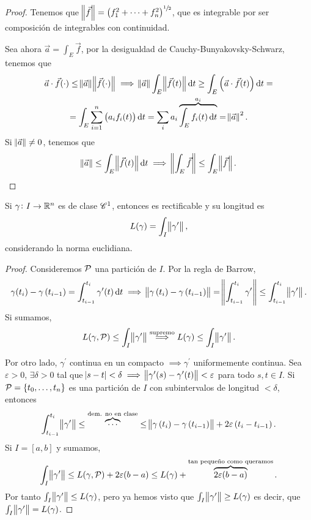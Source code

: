 \begin{proof}
    Tenemos que $\norm{\vec{f}} = \left( f^2_1 + \cdots + f^2_n \right)^{\sfrac{1}{2}}$, que es integrable por ser composición de
    integrables con continuidad.

    Sea ahora $\vec{a} = \int_E \vec{f}$, por la desigualdad de Cauchy-Bunyakovsky-Schwarz, tenemos que
    \begin{gather*}
        \vec{a} \cdot \vec{f}(\cdot) \leq \norm{\vec{a}} \norm{\vec{f}(\cdot)} \implies
        \norm{\vec{a}} \int_E \norm{\vec{f}(t)} \dif t \geq \int_E \left( \vec{a} \cdot \vec{f}(t) \right) \dif t = \\ =
        \int_E \sum^n_{i=1} \left(a_if_i(t) \right) \dif t = \sum_i a_i \overbrace{\int_E f_i(t) \dif t}^{a_i} = \norm{\vec{a}}^2.
    \end{gather*}
    Si $\norm{\vec{a}} \neq 0$, tenemos que
    \[
        \norm{\vec{a}} \leq \int_E \norm{\vec{f}(t)} \dif t \implies
        \norm{\int_E \vec{f}} \leq \int_E \norm{\vec{f}}.
    \]
\end{proof}


\begin{prop}
    Si $\gamma \colon I \to \mathbb{R}^n$ es de clase $\mathscr{C}^1$, entonces es rectificable y su longitud es
    \[
        L(\gamma) = \int_I \norm{\gamma^\prime},
    \]
	considerando la norma euclidiana.
\end{prop}

\begin{proof}
	Consideremos $\mathcal{P}$ una partición de $I$. Por la regla de Barrow,
	\[
        \gamma(t_i) - \gamma\left( t_{i-1} \right) = \int^{t_i}_{t_{i-1}} \gamma^\prime(t) \dif t \implies
        \norm{\gamma\left( t_i \right) - \gamma\left( t_{i-1} \right)} = \norm{\int^{t_i}_{t_{i-1}} \gamma^\prime
        } \leq \int^{t_i}_{t_{i-1}} \norm{\gamma^\prime}.
	\]
    Si sumamos,
    \[
        L(\gamma, \mathcal{P}) \leq \int_I \norm{\gamma^\prime} \stackrel{\text{supremo}}{\implies} L(\gamma) \leq \int_I \norm{\gamma^\prime}.
    \]

    Por otro lado, $\gamma^\prime$ continua en un compacto $\implies \gamma^\prime$ uniformemente continua. Sea $\varepsilon > 0$, $\exists \delta > 0$
    tal que $\abs{s - t} < \delta \implies \norm{\gamma^\prime(s) - \gamma^\prime(t)} < \varepsilon$ para todo $s,t \in I$. Si $\mathcal{P} = \left\{t_0, \dots, t_n\right\}$
    es una partición de $I$ con subintervalos de longitud $< \delta$, entonces
    \[
        \int^{t_i}_{t_{i-1}} \norm{\gamma^\prime} \leq \overbrace{\cdots}^{\text{dem. no en clase}} \leq \norm{\gamma\left( t_i \right) - \gamma\left( t_{i-1} \right)}
        + 2 \varepsilon\left( t_i - t_{i-1} \right).
    \]
    Si $I = [a, b]$ y sumamos,
    \[
        \int_I \norm{\gamma^\prime} \leq L(\gamma, \mathcal{P}) + 2\varepsilon(b-a) \leq L(\gamma) + \overbrace{2\varepsilon(b-a)}^{\text{tan pequeño como queramos}}.
    \]
    Por tanto $\int_I \norm{\gamma^\prime} \leq L(\gamma)$, pero ya hemos visto que $\int_I \norm{\gamma^\prime} \geq L(\gamma)$ es decir, que
    $\int_I \norm{\gamma^\prime} = L(\gamma)$.
\end{proof}

